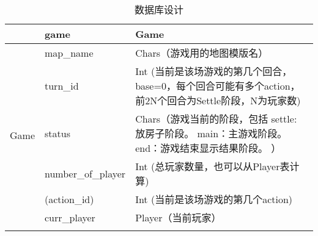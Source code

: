\begin{longtable}{p{} | p{} p{}}
&game &Game \\ \cline{2-3}
\hline
\multirow{6}{*}{Game} &map\_name &Chars（游戏用的地图模版名） \\ \cline{2-3}
&turn\_id &Int (当前是该场游戏的第几个回合，base=0，每个回合可能有多个action，前2N个回合为Settle阶段，N为玩家数) \\ \cline{2-3}
&status &Chars（游戏当前的阶段，包括 settle: 放房子阶段。 main：主游戏阶段。 end：游戏结束显示结果阶段。 ） \\ \cline{2-3}
&number\_of\_player &Int (总玩家数量，也可以从Player表计算) \\ \cline{2-3}
&(action\_id) &Int (当前是该场游戏的第几个action) \\ \cline{2-3}
&curr\_player &Player（当前玩家） \\ \cline{2-3}
\bottomrule
\caption{数据库设计}\label{tab: }
\scriptsize
\end{longtable}
